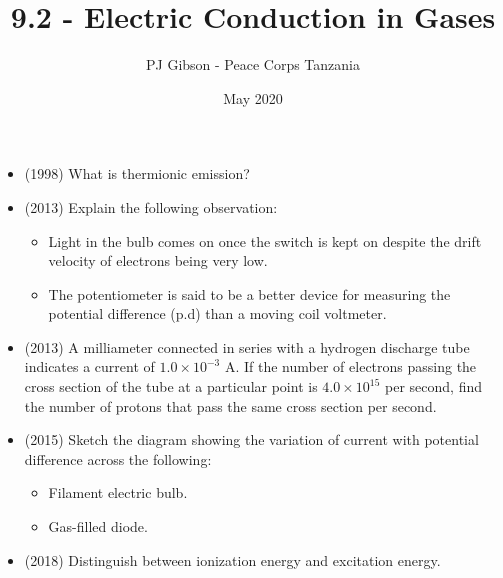 \documentclass{article}
\title{\textbf{9.2 - Electric Conduction in Gases}}
\author{PJ Gibson - Peace Corps Tanzania}
\date{May 2020}
\begin{document}
\maketitle

\begin{itemize}
\item (1998)  What is thermionic emission?
\item (2013)  Explain the following observation:
 \begin{itemize}
\item Light in the bulb comes on once the switch is kept on despite the drift velocity of electrons being very low.
\item The potentiometer is said to be a better device for measuring the potential difference (p.d) than a moving coil voltmeter.
\end{itemize}
\item (2013)  A milliameter connected in series with a hydrogen discharge tube indicates a current of $ 1.0 \times 10^{-3}$ A. If the number of electrons passing the cross section of the tube at a particular point is $ 4.0 \times 10^{15}$ per second, find the number of protons that pass the same cross section per second. 
\item (2015)  Sketch the diagram showing the variation of current with potential difference across the following:
 \begin{itemize}
\item  Filament electric bulb. 
\item Gas-filled diode. 
\end{itemize}
\item (2018)  Distinguish between ionization energy and excitation energy.
\end{itemize}
\end{document}
